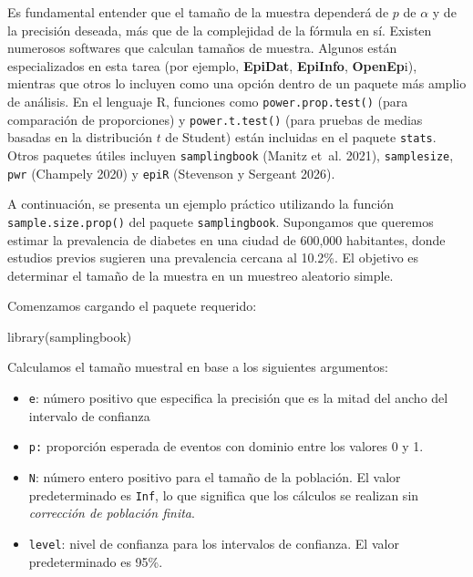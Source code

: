 \documentclass[
  spanish,
  a4paper,
]{scrbook}
\newenvironment{Shaded}{\begin{snugshade}}{\end{snugshade}}
\newcommand{\FunctionTok}[1]{\textcolor[rgb]{0.28,0.35,0.67}{#1}}
\newcommand{\NormalTok}[1]{\textcolor[rgb]{0.00,0.23,0.31}{#1}}
\providecommand{\tightlist}{%
  \setlength{\itemsep}{0pt}\setlength{\parskip}{0pt}}
\begin{document}
Es fundamental entender que el tamaño de la muestra dependerá de \(p\)
de \(\alpha\) y de la precisión deseada, más que de la complejidad de la
fórmula en sí. Existen numerosos softwares que calculan tamaños de
muestra. Algunos están especializados en esta tarea (por ejemplo,
\textbf{EpiDat}, \textbf{EpiInfo}, \textbf{OpenEp}i), mientras que otros
lo incluyen como una opción dentro de un paquete más amplio de análisis.
En el lenguaje R, funciones como \texttt{power.prop.test()} (para
comparación de proporciones) y \texttt{power.t.test()} (para pruebas de
medias basadas en la distribución \(t\) de Student) están incluidas en
el paquete \texttt{stats}. Otros paquetes útiles incluyen
\texttt{samplingbook} (Manitz et~al. 2021), \texttt{samplesize},
\texttt{pwr} (Champely 2020) y \texttt{epiR} (Stevenson y Sergeant
2026).

A continuación, se presenta un ejemplo práctico utilizando la función
\texttt{sample.size.prop()} del paquete \texttt{samplingbook}.
Supongamos que queremos estimar la prevalencia de diabetes en una ciudad
de 600,000 habitantes, donde estudios previos sugieren una prevalencia
cercana al 10.2\%. El objetivo es determinar el tamaño de la muestra en
un muestreo aleatorio simple.

Comenzamos cargando el paquete requerido:

\begin{Shaded}
\begin{Highlighting}[]
\FunctionTok{library}\NormalTok{(samplingbook)}
\end{Highlighting}
\end{Shaded}

Calculamos el tamaño muestral en base a los siguientes argumentos:

\begin{itemize}
\tightlist
\item
  \texttt{e}: número positivo que especifica la precisión que es la
  mitad del ancho del intervalo de confianza
\item
  \texttt{p:} proporción esperada de eventos con dominio entre los
  valores 0 y 1.
\item
  \texttt{N}: número entero positivo para el tamaño de la población. El
  valor predeterminado es \texttt{Inf}, lo que significa que los
  cálculos se realizan sin \emph{corrección de población finita}.
\item
  \texttt{level}: nivel de confianza para los intervalos de confianza.
  El valor predeterminado es 95\%.
\end{itemize}
\end{document}
